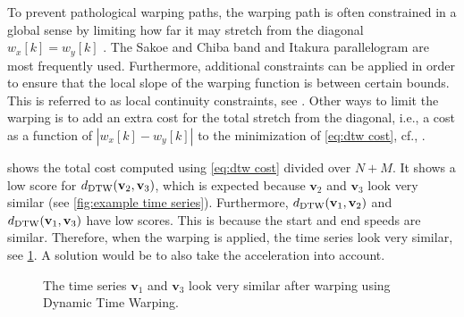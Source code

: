 \documentclass[10pt,final,a4paper,oneside,onecolumn]{article}
\newlength\figurewidth
\newlength\figureheight
\newcommand{\ddtw}{d_{\textup{DTW}}}
\newcommand{\profile}[1]{\textbf{v}_{#1}}
\theoremstyle{plain}\newtheorem{definition}{Definition}[section]    %
\theoremstyle{definition}\newtheorem{example}{Example}[section]     %
\theoremstyle{remark}\newtheorem{remarkenv}{Remark}[section]        %
\begin{document}
To prevent pathological warping paths, the warping path is often constrained in a global sense by limiting how far it may stretch from the diagonal $w_x[k]=w_y[k]$ \cite{keogh2005exactDTW}. The Sakoe and Chiba band \cite{sakoe1978dynamic} and Itakura parallelogram \cite{itakura1975minimum} are most frequently used. Furthermore, additional constraints can be applied in order to ensure that the local slope of the warping function is between certain bounds. This is referred to as local continuity constraints, see \cite{rabiner1993speech}. Other ways to limit the warping is to add an extra cost for the total stretch from the diagonal, i.e., a cost as a function of $|w_x[k] - w_y[k]|$ to the minimization of \cref{eq:dtw cost}, cf., \cite{roberts1987enhancements, wang1997alignment}.

 shows the total cost computed using \cref{eq:dtw cost} divided over $N+M$. It shows a low score for $\ddtw(\profile{2}, \profile{3})$, which is expected because $\profile{2}$ and $\profile{3}$ look very similar (see \cref{fig:example time series}). Furthermore, $\ddtw(\profile{1}, \profile{2})$ and $\ddtw(\profile{1}, \profile{3})$ have low scores. This is because the start and end speeds are similar. Therefore, when the warping is applied, the time series look very similar, see \cref{fig:example dtw}. A solution would be to also take the acceleration into account.

\begin{figure}
	\centering
	\setlength{}
	\setlength{}
	
	\caption{The time series $\profile{1}$ and $\profile{3}$ look very similar after warping using Dynamic Time Warping.}
	\label{fig:example dtw}
\end{figure}


\printbibliography
\end{document}
